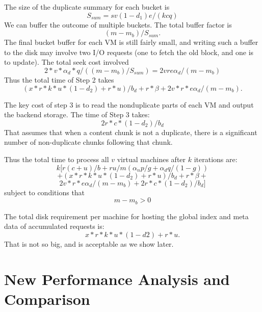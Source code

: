 The size of  the duplicate summary for each bucket is
\[
S_{sum}= sv(1-d_1)e /(k c q)
\]
We can buffer the outcome of multiple buckets. The total buffer factor is 
\[
(m-m_b)/ S_{sum}.
\]
The final bucket buffer for each VM is still fairly small, and writing such a buffer to the disk may involve two I/O requests (one to fetch the old block, and one is to update). The total seek cost involved 
\[
2*v*\alpha_d*q/ ((m-m_b)/S_{sum})= 2v r e  \alpha_d / (m-m_b)
\]
Thus the total time of Step 2 takes
\[
( x*r *k*u*(1-d_2) + r*u) / b_d  + r* \beta+   2v *r*e \alpha_d /  (m-m_b).
\]


The key cost of step 3  is to read the nonduplicate parts of each VM and output the backend storage. The time of Step 3  takes:
\[
2 r *c* (1-d_2) /b_d
\]
That assumes that when a content chunk is not a duplicate, there is a significant number of non-duplicate  chunks following that  chunk. 

Thus the total time to process all $v$ virtual machines after $k$ iterations are:
\[
k [
r  ( c+  u) /b   +r u /m (\alpha_n  p/g  + \alpha_d q/(1-g)  )
\]
\[
+( x*r *k*u*(1-d_2) + r*u) / b_d  + r* \beta+   
\]
\[
2v *r*e \alpha_d /  (m-m_b)
+2 r *c* (1-d_2) /b_d
]
\]
subject to conditions that
\[
m - m_b> 0
\]

The total disk requirement  per machine for hosting the global index  and meta  data of  accumulated requests is:
\[
x*r *k*u*(1-d2) + r*u.
\]
That is not so big, and is acceptable as we show later.


\section{New Performance Analysis and Comparison}
\label{sect:analysis}

